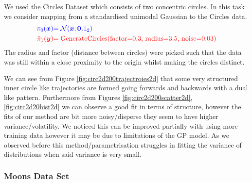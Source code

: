 \documentclass[a4paper,12pt,twoside,openright]{report}
\theoremstyle{definition}
\begin{document}
We  used the Circles Dataset \citep{pedregosa2011scikit} which consists of two concentric circles. In this task we consider mapping from a standardised unimodal Gaussian to the Circles data.
\begin{align*}
     \color{blue}{\pi_0({\bm{x}})} &\color{blue}{= {\mathcal{N}}({\bm{x}}; {\bm{0}},  \mathbb{I}_2)} \\
    \color{red}{\hat{\pi}_1({\bm{y}})} &\color{red}{= \text{GenerateCircles(factor=0.3, radius=3.5, noise=0.03)}}
\end{align*}
The radius and factor (distance between circles) were picked such that the data was still within a close proximity to the origin whilst making the circles distinct.

We can see from Figure \ref{fig:circ2d200trajectroies2d} that some very structured inner circle like trajectories are formed going forwards and backwards with a dual like pattern. Furthermore from Figures \ref{fig:circ2d200scatter2d}, \ref{fig:circ2d20hist2d} we can observe a good fit in terms of structure, however the fits of our method are  bit more noisy/disperse they seem to have higher variance/volatility. We noticed this can be improved partially with using more training data however it may be due to limitations of the GP model. As we observed before this method/parametrisation struggles in fitting the variance of distributions when said variance is very small.


\subsubsection{Moons Data Set}
\end{document}
